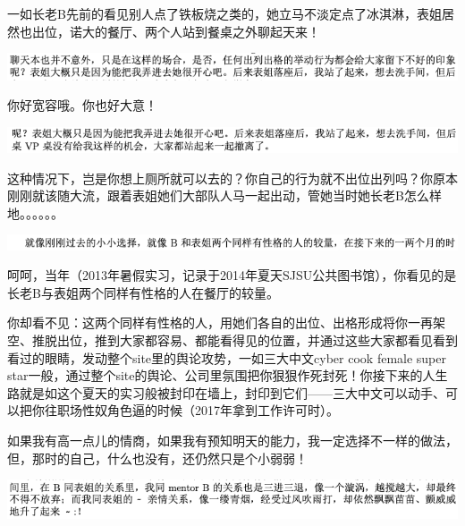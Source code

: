 \documentclass[9pt, b5paper]{article}
\begin{document}
一如长老B先前的看见别人点了铁板烧之类的，她立马不淡定点了冰淇淋，表姐居然也出位，诺大的餐厅、两个人站到餐桌之外聊起天来！

\begin{center}
\includegraphics[width=.9\linewidth]{./pic/backups_plans_20210504_215123.png}
\end{center}

你好宽容哦。你也好大意！

\begin{center}
\includegraphics[width=.9\linewidth]{./pic/backups_plans_20210504_215213.png}
\end{center}

这种情况下，岂是你想上厕所就可以去的？你自己的行为就不出位出列吗？你原本刚刚就该随大流，跟着表姐她们大部队人马一起出动，管她当时她长老B怎么样地。。。。。。

\begin{center}
\includegraphics[width=.9\linewidth]{./pic/backups_plans_20210505_112052.png}
\end{center}

呵呵，当年（2013年暑假实习，记录于2014年夏天SJSU公共图书馆），你看见的是长老B与表姐两个同样有性格的人在餐厅的较量。

你却看不见：这两个同样有性格的人，用她们各自的出位、出格形成将你一再架空、推脱出位，推到大家都容易、都能看得见的位置，并通过这些大家都看见看到看过的眼睛，发动整个site里的舆论攻势，一如三大中文cyber cook female super star一般，通过整个site的舆论、公司里氛围把你狠狠作死封死！你接下来的人生路就是如这个夏天的实习般被封印在墙上，封印到它们——三大中文可以动手、可以把你往职场性奴角色逼的时候（2017年拿到工作许可时）。

如果我有高一点儿的情商，如果我有预知明天的能力，我一定选择不一样的做法，但，那时的自己，什么也没有，还仍然只是个小弱弱！

\begin{center}
\includegraphics[width=.9\linewidth]{./pic/backups_plans_20210505_112203.png}
\end{center}
\end{document}
